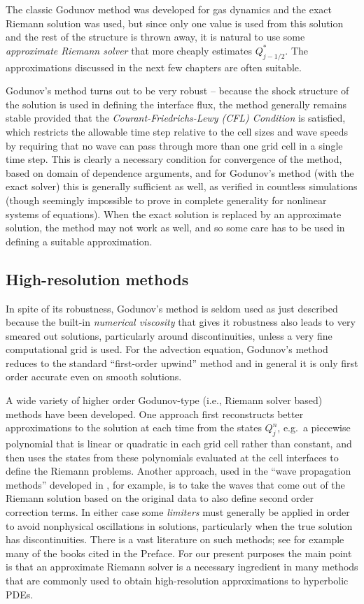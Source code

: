 \documentclass{SIAMbook2016}
\begin{document}
The classic Godunov method was developed for gas dynamics and the exact
Riemann solution was used, but since only one value is used from this
solution and the rest of the structure is thrown away, it is natural to
use some \emph{approximate Riemann solver} that more cheaply estimates
\(Q_{j-1/2}^*\). The approximations discussed in the next few chapters
are often suitable.

Godunov's method turns out to be very robust -- because the shock
structure of the solution is used in defining the interface flux, the
method generally remains stable provided that the
\emph{Courant-Friedrichs-Lewy (CFL) Condition} is satisfied, which
restricts the allowable time step relative to the cell sizes and wave
speeds by requiring that no wave can pass through more than one grid
cell in a single time step. This is clearly a necessary condition for
convergence of the method, based on domain of dependence arguments, and
for Godunov's method (with the exact solver) this is generally
sufficient as well, as verified in countless simulations (though
seemingly impossible to prove in complete generality for nonlinear
systems of equations). When the exact solution is replaced by an
approximate solution, the method may not work as well, and so some care
has to be used in defining a suitable approximation.

\hypertarget{high-resolution-methods}{%
\subsection{High-resolution methods}\label{high-resolution-methods}}

In spite of its robustness, Godunov's method is seldom used as just
described because the built-in \emph{numerical viscosity} that gives it
robustness also leads to very smeared out solutions, particularly around
discontinuities, unless a very fine computational grid is used. For the
advection equation, Godunov's method reduces to the standard
``first-order upwind'' method and in general it is only first order
accurate even on smooth solutions.

A wide variety of higher order Godunov-type (i.e., Riemann solver based)
methods have been developed. One approach first reconstructs better
approximations to the solution at each time from the states \(Q_j^n\),
e.g.~a piecewise polynomial that is linear or quadratic in each grid
cell rather than constant, and then uses the states from these
polynomials evaluated at the cell interfaces to define the Riemann
problems. Another approach, used in the ``wave propagation methods''
developed in \cite{fvmhp}, for example, is to take the waves that come
out of the Riemann solution based on the original data to also define
second order correction terms. In either case some \emph{limiters} must
generally be applied in order to avoid nonphysical oscillations in
solutions, particularly when the true solution has discontinuities.
There is a vast literature on such methods; see for example many of the
books cited in the Preface. For our present
purposes the main point is that an approximate Riemann solver is a
necessary ingredient in many methods that are commonly used to obtain
high-resolution approximations to hyperbolic PDEs.
\end{document}
